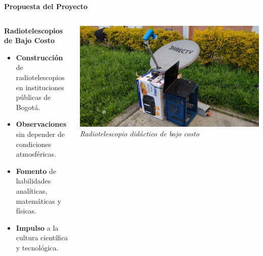 \begin{frame}{\textbf{Propuesta del Proyecto}}
  \begin{columns}
    \begin{block}{\textbf{Radiotelescopios de Bajo Costo}}
      \begin{itemize}
        \item \textbf{Construcción} de radiotelescopios en instituciones públicas de Bogotá.
          \pause
        \item \textbf{Observaciones} sin depender de condiciones atmosféricas.
          \pause
        \item \textbf{Fomento} de habilidades analíticas, matemáticas y físicas.
          \pause
        \item \textbf{Impulso} a la cultura científica y tecnológica.
      \end{itemize}
    \end{block}
    \centering
    \includegraphics[width=\linewidth]{./Figures/radiotelescope.jpeg}
    \newline
    \small{\textit{Radiotelescopio didáctico de bajo costo}}
  \end{columns}
\end{frame}
